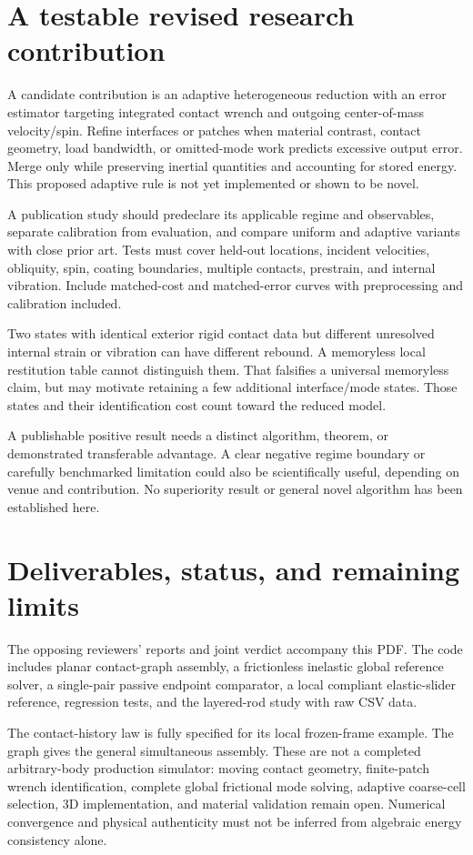 \documentclass[11pt,a4paper]{article}
\begin{document}
\section{A testable revised research contribution}
A candidate contribution is an adaptive heterogeneous reduction with an error estimator targeting integrated contact wrench and outgoing center-of-mass velocity/spin. Refine interfaces or patches when material contrast, contact geometry, load bandwidth, or omitted-mode work predicts excessive output error. Merge only while preserving inertial quantities and accounting for stored energy. This proposed adaptive rule is not yet implemented or shown to be novel.

A publication study should predeclare its applicable regime and observables, separate calibration from evaluation, and compare uniform and adaptive variants with close prior art. Tests must cover held-out locations, incident velocities, obliquity, spin, coating boundaries, multiple contacts, prestrain, and internal vibration. Include matched-cost and matched-error curves with preprocessing and calibration included.

Two states with identical exterior rigid contact data but different unresolved internal strain or vibration can have different rebound. A memoryless local restitution table cannot distinguish them. That falsifies a universal memoryless claim, but may motivate retaining a few additional interface/mode states. Those states and their identification cost count toward the reduced model.

A publishable positive result needs a distinct algorithm, theorem, or demonstrated transferable advantage. A clear negative regime boundary or carefully benchmarked limitation could also be scientifically useful, depending on venue and contribution. No superiority result or general novel algorithm has been established here.

\section{Deliverables, status, and remaining limits}
The opposing reviewers' reports and joint verdict accompany this PDF. The code includes planar contact-graph assembly, a frictionless inelastic global reference solver, a single-pair passive endpoint comparator, a local compliant elastic-slider reference, regression tests, and the layered-rod study with raw CSV data.

The contact-history law is fully specified for its local frozen-frame example. The graph gives the general simultaneous assembly. These are not a completed arbitrary-body production simulator: moving contact geometry, finite-patch wrench identification, complete global frictional mode solving, adaptive coarse-cell selection, 3D implementation, and material validation remain open. Numerical convergence and physical authenticity must not be inferred from algebraic energy consistency alone.
\end{document}
